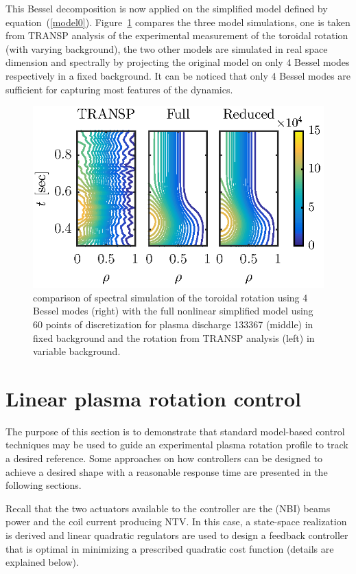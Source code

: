 \documentclass[12pt]{iopart}
\begin{document}
This Bessel decomposition is now applied on the simplified model defined by equation~(\ref{model0}). Figure~\ref{bessel1} compares the three model simulations, one is taken from TRANSP analysis of the experimental measurement of the toroidal rotation (with varying background), the two other models are simulated in real space dimension and spectrally by projecting the original model on only 4 Bessel modes respectively in a fixed background. It can be noticed that only 4 Bessel modes are sufficient for capturing most features of the dynamics.
\begin{figure}
\includegraphics[width=\linewidth]{imene_figs/fig11bis} %
\caption{comparison of spectral simulation of the toroidal rotation using 4 Bessel modes (right) with the full nonlinear simplified model using 60 points of discretization for plasma discharge 133367 (middle) in fixed background and the rotation from TRANSP analysis (left) in variable background. }
\label{bessel1}
\end{figure}

\section{Linear plasma rotation control}
 \label{LRPC}
 
 The purpose of this section is to demonstrate that standard model-based control techniques may be used to guide an experimental plasma rotation profile to track a desired reference. Some approaches on how controllers can be designed to achieve a desired shape with a reasonable response time are presented in the following sections.
 
 Recall that the two actuators available to the controller are the (NBI) beams power and the coil current producing NTV.
In this case, a state-space realization is derived and linear quadratic regulators are used to design a feedback controller that is optimal in minimizing a prescribed quadratic cost function (details are explained below).
\end{document}
